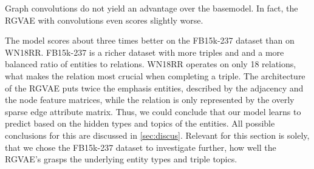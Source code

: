 Graph convolutions do not yield an advantage over the basemodel. In fact, the RGVAE with convolutions even scores slightly worse. 

The model scores about three times better on the FB15k-237 dataset than on WN18RR. FB15k-237 is a richer dataset with more triples and and a more balanced ratio of entities to relations. WN18RR operates on only 18 relations, what makes the relation most crucial when completing a triple. The architecture of the RGVAE puts twice the emphasis entities, described by the adjacency and the node feature matrices, while the relation is only represented by the overly sparse edge attribute matrix. Thus, we could conclude that our model learns to predict based on the hidden types and topics of the entities. All possible conclusions for this are discussed in \ref{sec:discus}. Relevant for this section is solely, that we chose the FB15k-237 dataset to investigate further, how well the RGVAE's grasps the underlying entity types and triple topics.   



